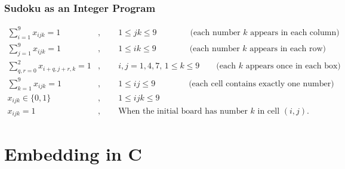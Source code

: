 \documentclass{beamer}
\begin{document}
    \begin{frame}
        \frametitle{Sudoku as an Integer Program}
        \footnotesize
        \begin{align*}
            \sum_{i=1}^9 x_{ijk} = 1&,\qquad 1\leq jk\leq 9\qquad\qquad\text{(each number $k$ appears in each column)}\\
            \sum_{j=1}^9 x_{ijk} = 1&,\qquad 1\leq ik\leq 9\qquad\qquad\text{(each number $k$ appears in each row)} \\
            \sum_{q,r=0}^2x_{i+q,j+r,k} = 1&, \qquad i,j=1,4,7,\, 1\leq k \leq 9 \qquad\text{(each $k$ appears once in each box)}\\
            \sum_{k=1}^9 x_{ijk} = 1&,\qquad 1\leq ij\leq 9\qquad\qquad\text{(each cell contains exactly one number)} \\
            x_{ijk}\in\{0,1\} &, \qquad 1\leq ijk\leq 9 \\
            x_{ijk} = 1 &,  \qquad\text{When the initial board has number $k$ in cell $(i,j)$.}
        \end{align*}
    \end{frame}
    \section{Embedding in C}
\end{document}
